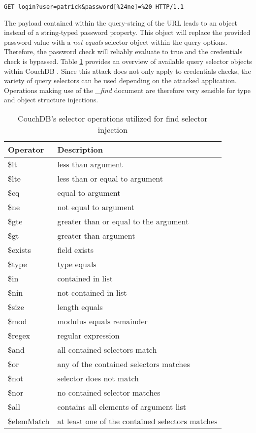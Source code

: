 \begin{lstlisting}[caption={Attack vector against CouchDB for speical key injection via the query-string parameter}, label={lst:FindSelectorInjectionAttack}]
GET login?user=patrick&password[%24ne]=%20 HTTP/1.1
\end{lstlisting}

The payload contained within the query-string of the URL leads to an object instead of a string-typed password property. This object will replace the provided password value with a \emph{not equals} selector object within the query options. Therefore, the password check will reliably evaluate to true and the credentials check is bypassed. Table \ref{tab:couchdb_affected_selectors} provides an overview of available query selector objects within CouchDB \cite{ASF2016a}. Since this attack does not only apply to credentials checks, the variety of query selectors can be used depending on the attacked application. Operations making use of the \emph{\_find} document are therefore very sensible for type and object structure injections. \\

\begin{table}[h]
 \sffamily
 \centering
 \begin{tabular}{ll}
  \textbf{Operator} & \textbf{Description} \\ \hline
  \$lt      & less than argument\\
  \$lte     & less than or equal to argument \\
  \$eq      & equal to argument \\
  \$ne      & not equal to argument \\
  \$gte     & greater than or equal to the argument \\
  \$gt      & greater than argument \\
  \$exists  & field exists \\
  \$type    & type equals \\
  \$in      & contained in list \\
  \$nin     & not contained in list \\
  \$size    & length equals \\
  \$mod     & modulus equals remainder \\
  \$regex   & regular expression \\
  \$and     & all contained selectors match \\
  \$or      & any of the contained selectors matches \\
  \$not     & selector does not match \\
  \$nor     & no contained selector matches \\
  \$all     & contains all elements of argument list \\ 
  \$elemMatch & at least one of the contained selectors matches \\
  \bottomrule 
 \end{tabular}
 \caption{CouchDB's selector operations utilized for find selector injection}
 \label{tab:couchdb_affected_selectors}
\end{table}

